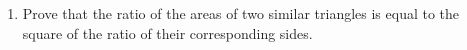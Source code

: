 \begin{enumerate}
\item Prove that the ratio of the areas of two similar triangles is equal to the square of the ratio of their corresponding sides. 
\end{enumerate}

